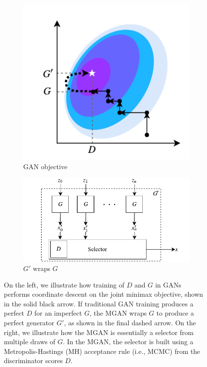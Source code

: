 \documentclass{article}
\begin{document}
\begin{figure}[bhtp]
    \centering
    \begin{subfigure}[t]{2.25in}
       \centering
       \includegraphics[scale=1.0]{figures/coord_descent.pdf}
       \caption{GAN objective}
    \end{subfigure}
    \hfill
    \begin{subfigure}[t]{3in}
       \centering
       \includegraphics[scale=1.0]{figures/block_diag.pdf}
       \caption{$G'$ wraps $G$}
    \end{subfigure}
    \caption{{\small
    On the left, we illustrate how training of $D$ and $G$ in GANs performs coordinate descent on the joint minimax objective, shown in the solid black arrow.
    If traditional GAN training produces a perfect $D$ for an imperfect $G$, the MGAN wraps $G$ to produce a perfect generator $G'$, as shown in the final dashed arrow.
    On the right, we illustrate how the MGAN is essentially a selector from multiple draws of $G$.
    In the MGAN, the selector is built using a Metropolis-Hastings (MH) acceptance rule (i.e., MCMC) from the discriminator scores $D$.
    }}
    \label{fig:block_diag}
\end{figure}
\end{document}
